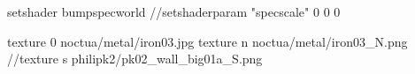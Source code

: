 setshader bumpspecworld
//setshaderparam "specscale" 0 0 0

texture 0 noctua/metal/iron03.jpg
texture n noctua/metal/iron03_N.png
//texture s philipk2/pk02_wall_big01a_S.png
